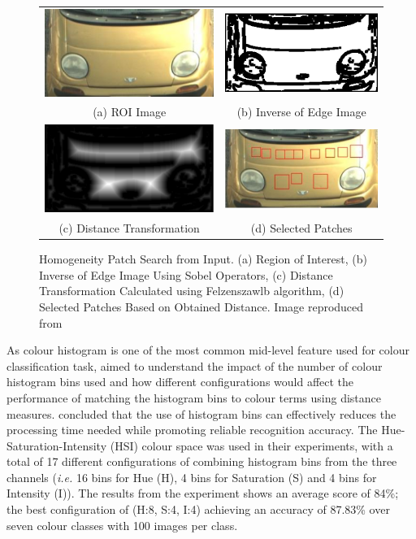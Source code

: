 \begin{figure}[!htb]
 \centering
 \begin{tabular}{cc}
  \includegraphics[width=0.3\linewidth]{image/lit/homo1.png}
 & \includegraphics[width=0.3\linewidth]{image/lit/homo3.png} \\
  (a) ROI Image
 & (b) Inverse of Edge Image \\
  \includegraphics[width=0.3\linewidth]{image/lit/homo2.png} &
  \includegraphics[width=0.3\linewidth]{image/lit/homo4.png} \\
  (c) Distance Transformation &
  (d) Selected Patches\\
 \end{tabular}
 \caption[Homogeneity Patch Search from Input. (a) Region of Interest, (b)
Inverse of Edge Image Using Sobel Operators, (c) Distance Transformation
Calculated using Felzen-szwlb algorithm, (d) Selected Patches Based on Obtained
Distance.]{Homogeneity Patch Search from Input. (a) Region of Interest, (b)
Inverse of Edge Image Using Sobel Operators, (c) Distance Transformation
Calculated using Felzenszawlb algorithm, (d) Selected Patches Based on Obtained
Distance. Image reproduced from 
 \label{fig:colorpatches}}
\end{figure}

As colour histogram is one of the most common mid-level feature used for colour
classification task,  aimed to understand the impact of the number of colour histogram bins used and how different configurations
would affect the performance of matching the histogram bins to colour terms
using distance measures.  concluded that the use of histogram bins can effectively reduces the processing time needed while promoting reliable recognition accuracy. The Hue-Saturation-Intensity (HSI) colour space was used in their experiments, with a total of 17 different configurations of combining histogram bins from the three channels (\emph{i.e.} 16 bins for Hue (H), 4 bins for Saturation (S) and 4 bins for Intensity (I)). The results from the experiment shows an average score of 84\%; the best
configuration of (H:8, S:4, I:4) achieving an accuracy of 87.83\% over seven colour classes with 100 images per class.


